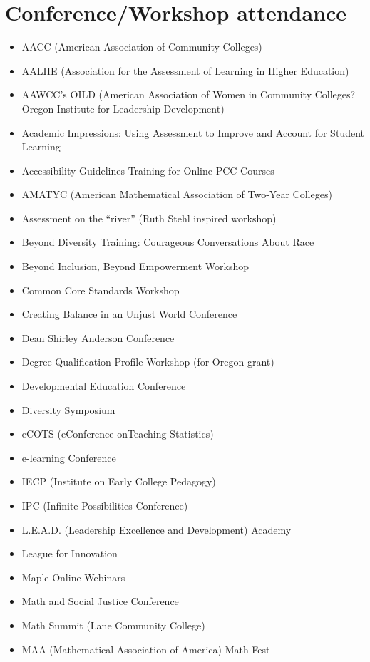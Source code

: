 \section*{Conference/Workshop attendance}

\begin{itemize}[label={}]
\item AACC (American Association of Community Colleges)
\item AALHE (Association for the Assessment of Learning in Higher Education)
\item AAWCC's OILD (American Association of Women in Community Colleges? Oregon Institute for Leadership Development)
\item Academic Impressions: Using Assessment to Improve and Account for Student Learning
\item Accessibility Guidelines Training for Online PCC Courses
\item AMATYC (American Mathematical Association of Two-Year Colleges)
\item Assessment on the ``river'' (Ruth Stehl inspired workshop)
\item Beyond Diversity Training: Courageous Conversations About Race
\item Beyond Inclusion, Beyond Empowerment Workshop
\item Common Core Standards Workshop
\item Creating Balance in an Unjust World Conference
\item Dean Shirley Anderson Conference
\item Degree Qualification Profile Workshop (for Oregon grant)
\item Developmental Education Conference
\item Diversity Symposium
\item eCOTS  (eConference onTeaching Statistics)
\item e-learning Conference
\item IECP (Institute on Early College Pedagogy)
\item IPC (Infinite Possibilities Conference)
\item L.E.A.D. (Leadership Excellence and Development) Academy
\item League for Innovation
\item Maple Online Webinars
\item Math and Social Justice Conference
\item Math Summit (Lane Community College)
\item MAA (Mathematical Association of America) Math Fest

\end{itemize}
